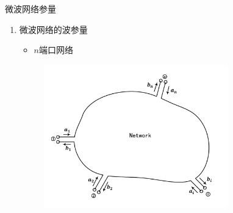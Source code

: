 \begin{frame}{微波网络参量}
    \begin{enumerate}
        \resume
        \item 微波网络的波参量\\
              \begin{itemize}
                  \item $n$端口网络
              \end{itemize}
              \begin{figure}
                  \includegraphics[width=8cm]{Cha5//fig5-13.pdf}
              \end{figure}
    \end{enumerate}
\end{frame}

